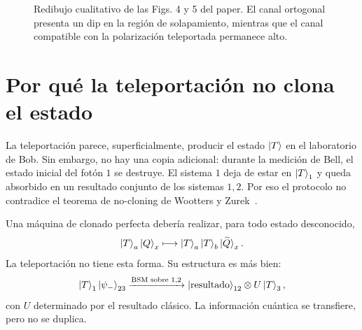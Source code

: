 \documentclass[../main.tex]{subfiles}
\begin{document}
\begin{figure}[htbp]
    \centering
    \shorthandoff{<>}
    \caption{Redibujo cualitativo de las Figs. 4 y 5 del paper. El canal ortogonal presenta un dip en la región de solapamiento, mientras que el canal compatible con la polarización teleportada permanece alto.}
    \label{fig:resultados-dips}
\end{figure}

\section{Por qué la teleportación no clona el estado}

La teleportación parece, superficialmente, producir el estado $\ket{T}$ en el laboratorio de Bob. Sin embargo, no hay una copia adicional: durante la medición de Bell, el estado inicial del fotón $1$ se destruye. El sistema $1$ deja de estar en $\ket{T}_1$ y queda absorbido en un resultado conjunto de los sistemas $1,2$. Por eso el protocolo no contradice el teorema de no-cloning de Wootters y Zurek~\cite{WoottersZurek1982}.

Una máquina de clonado perfecta debería realizar, para todo estado desconocido,
\begin{equation*}
    \ket{T}_a\ket{Q}_x
    \longmapsto
    \ket{T}_a\ket{T}_b\ket{\widetilde Q}_x.
\end{equation*}
La teleportación no tiene esta forma. Su estructura es más bien:
\begin{equation*}
    \ket{T}_1\ket{\psi_-}_{23}
    \xrightarrow{\text{BSM sobre }1,2}
    \ket{\text{resultado}}_{12}\otimes U\ket{T}_3,
\end{equation*}
con $U$ determinado por el resultado clásico. La información cuántica se transfiere, pero no se duplica.
\end{document}
